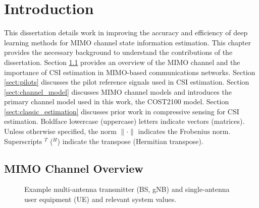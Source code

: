 \chapter{Introduction}
\label{chap:intro}


This dissertation details work in improving the accuracy and efficiency of deep learning methods for MIMO channel state information estimation. This chapter provides the necessary background to understand the contributions of the dissertation. Section \ref{sect:mimo_model} provides an overview of the MIMO channel and the importance of CSI estimation in MIMO-based communications networks. Section \ref{sect:pilots} discusses the pilot reference signals used in CSI estimation. Section \ref{sect:channel_model} discusses MIMO channel models and introduces the primary channel model used in this work, the COST2100 model. Section \ref{sect:classic_estimation} discusses prior work in compressive sensing for CSI estimation.  
Boldface lowercase (uppercase) letters indicate vectors (matrices). Unless otherwise specified, the norm $\|\cdot\|$ indicates the Frobenius norm. Superscripts $^T$ ($^H$) indicate the transpose (Hermitian transpose).

\section{MIMO Channel Overview}
\label{sect:mimo_model}

\begin{figure}[!hbtp]
\centering
{
	\fontsize{6pt}{8pt}
	\def\svgwidth{0.8\columnwidth}
	
}
\caption{Example multi-antenna transmitter (BS, gNB) and single-antenna user equipment (UE) and relevant system values.}
\label{fig:mimo_schematic}
\end{figure}

